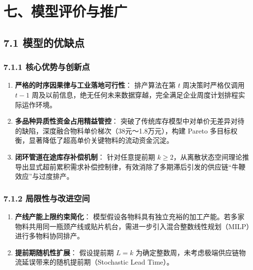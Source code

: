 \section{七、模型评价与推广}\label{ux4e03ux6a21ux578bux8bc4ux4ef7ux4e0eux63a8ux5e7f}

\subsection{7.1
模型的优缺点}\label{ux6a21ux578bux7684ux4f18ux7f3aux70b9}

\subsubsection{7.1.1
核心优势与创新点}\label{ux6838ux5fc3ux4f18ux52bfux4e0eux521bux65b0ux70b9}

\begin{enumerate}
\def\labelenumi{\arabic{enumi}.}
\tightlist
\item
  \textbf{严格的时序因果律与工业落地可行性}： 排产算法在第 \(t\)
  周决策时严格仅调用 \(t-1\)
  周及以前信息，绝无任何未来数据穿越，完全满足企业周度计划排程实际运作环境。
\item
  \textbf{多品种异质性资金占用精益管控}：
  突破了传统库存模型中对单价无差异对待的缺陷，深度融合物料单价梯次（38元～1.8万元），构建
  Pareto 多目标权衡，显著降低了超高单价关键物料的流动资金沉淀。
\item
  \textbf{闭环管道在途库存补偿机制}： 针对任意提前期
  \(k\ge 2\)，从离散状态空间理论推导出显式超前累积需求补偿控制律，有效消除了多期滞后引发的供应链``牛鞭效应''与过度排产。
\end{enumerate}

\subsubsection{7.1.2
局限性与改进空间}\label{ux5c40ux9650ux6027ux4e0eux6539ux8fdbux7a7aux95f4}

\begin{enumerate}
\def\labelenumi{\arabic{enumi}.}
\tightlist
\item
  \textbf{产线产能上限约束简化}：
  模型假设各物料具有独立充裕的加工产能。若多家物料共用同一瓶颈产线或贴片机台，需进一步引入混合整数线性规划（MILP）进行多物料协同排产。
\item
  \textbf{提前期随机性扩展}： 假设提前期 \(L=k\)
  为确定整数周，未考虑极端供应链物流延误带来的随机提前期（Stochastic
  Lead Time）。
\end{enumerate}

